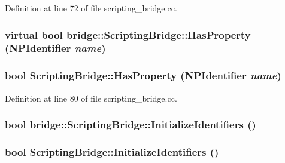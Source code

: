 Definition at line 72 of file scripting\_\-bridge.cc.

\hypertarget{classbridge_1_1_scripting_bridge_ad2cb9f2b860ba05a86c10f0824699e33}{
\subsubsection[{HasProperty}]{\setlength{\rightskip}{0pt plus 5cm}virtual bool bridge::ScriptingBridge::HasProperty (NPIdentifier {\em name})}}
\label{classbridge_1_1_scripting_bridge_ad2cb9f2b860ba05a86c10f0824699e33}
\hypertarget{classbridge_1_1_scripting_bridge_aeed261c756896802f26632acfceba1d7}{
\subsubsection[{HasProperty}]{\setlength{\rightskip}{0pt plus 5cm}bool ScriptingBridge::HasProperty (NPIdentifier {\em name})}}
\label{classbridge_1_1_scripting_bridge_aeed261c756896802f26632acfceba1d7}


Definition at line 80 of file scripting\_\-bridge.cc.

\hypertarget{classbridge_1_1_scripting_bridge_a86ef6533d8f6ed9573890f017c6084d9}{
\subsubsection[{InitializeIdentifiers}]{\setlength{\rightskip}{0pt plus 5cm}bool bridge::ScriptingBridge::InitializeIdentifiers ()}}
\label{classbridge_1_1_scripting_bridge_a86ef6533d8f6ed9573890f017c6084d9}
\hypertarget{classbridge_1_1_scripting_bridge_a05f2a65b751d12e6aeaa00bfd91ef83f}{
\subsubsection[{InitializeIdentifiers}]{\setlength{\rightskip}{0pt plus 5cm}bool ScriptingBridge::InitializeIdentifiers ()}}
\label{classbridge_1_1_scripting_bridge_a05f2a65b751d12e6aeaa00bfd91ef83f}


